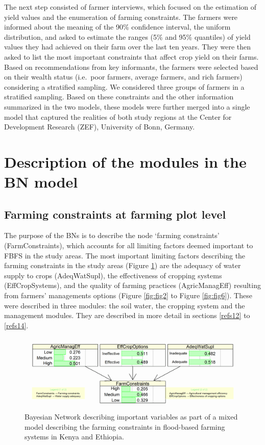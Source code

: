 \documentclass[]{elsarticle} %
\begin{document}
The next step consisted of farmer interviews, which focused on the estimation of yield values and the enumeration of farming constraints. The farmers were informed about the meaning of the 90\% confidence interval, the uniform distribution, and asked to estimate the ranges (5\% and 95\% quantiles) of yield values they had achieved on their farm over the last ten years. They were then asked to list the most important constraints that affect crop yield on their farms. Based on recommendations from key informants, the farmers were selected based on their wealth status (i.e.~poor farmers, average farmers, and rich farmers) considering a stratified sampling. We considered three groups of farmers in a stratified sampling. Based on these constraints and the other information summarized in the two models, these models were further merged into a single model that captured the realities of both study regions at the Center for Development Research (ZEF), University of Bonn, Germany.

\hypertarget{refs1}{%
\section{Description of the modules in the BN model}\label{refs1}}

\hypertarget{refs11}{%
\subsection{Farming constraints at farming plot level}\label{refs11}}

The purpose of the BNs is to describe the node `farming constraints' (FarmConstraints), which accounts for all limiting factors deemed important to FBFS in the study areas. The most important limiting factors describing the farming constraints in the study areas (Figure \ref{fig:fig1}) are the adequacy of water supply to crops (AdeqWatSupl), the effectiveness of cropping systems (EffCropSystems), and the quality of farming practices (AgricManagEff) resulting from farmers' managements options (Figure \ref{fig:fig2} to Figure \ref{fig:fig6}). These were described in three modules: the soil water, the cropping system and the management modules. They are described in more detail in sections \ref{refs12} to \ref{refs14}.

\begin{figure}[!h]

{\centering \includegraphics[width=1\linewidth,]{figures/figure_s1} 

}

\caption{Bayesian Network describing important variables as part of a mixed model describing the farming constraints in flood-based farming systems in Kenya and Ethiopia.}\label{fig:fig1}
\end{figure}
\end{document}
